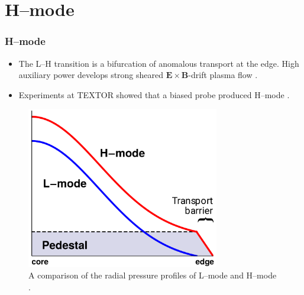 \documentclass[10pt]{beamer}
\begin{document}
\section{H--mode}
\begin{frame} %
\frametitle{H--mode}

\begin{itemize}
	\item The L--H transition is a bifurcation of anomalous transport at the edge. High auxiliary power develops strong sheared $\mathbf{E}\times\mathbf{B}$-drift plasma flow \parencite{terry_suppression_2000}.
	\item Experiments at TEXTOR showed that a biased probe produced H--mode \parencite{weynants_confinement_1992}.
\end{itemize}

\begin{figure}[tb] %
\begin{minipage}{0.59\linewidth}
	\centering
	\includegraphics[width=0.75\textwidth]{../Graphics/L-mode_H-mode_compare.png}
\end{minipage}
\hfill
\begin{minipage}{0.39\linewidth}
	\caption{A comparison of the radial pressure profiles of L--mode and H--mode \parencite{weymiens_bifurcation_2014}.}
	\label{fig:L-mode_H-mode_compare}
\end{minipage}
\end{figure}

\end{frame}

\end{document}
